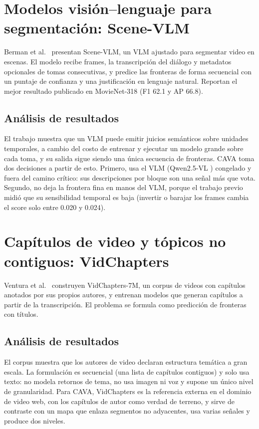 \section{Modelos visión--lenguaje para segmentación: Scene-VLM}

Berman et al.\ \cite{berman2025scenevlm} presentan Scene-VLM, un VLM ajustado para segmentar
video en escenas. El modelo recibe frames, la transcripción del diálogo y metadatos
opcionales de tomas consecutivas, y predice las fronteras de forma secuencial con un puntaje
de confianza y una justificación en lenguaje natural. Reportan el mejor resultado publicado
en MovieNet-318 (F1 62.1 y AP 66.8).

\subsection{Análisis de resultados}
El trabajo muestra que un VLM puede emitir juicios semánticos sobre unidades temporales, a
cambio del costo de entrenar y ejecutar un modelo grande sobre cada toma, y su salida sigue
siendo una única secuencia de fronteras. CAVA toma dos decisiones a partir de esto. Primero,
usa el VLM (Qwen2.5-VL \cite{bai2025qwen25vl}) congelado y fuera del camino crítico: sus
descripciones por bloque son una señal más que vota. Segundo, no deja la frontera fina en
manos del VLM, porque el trabajo previo midió que su sensibilidad temporal es baja (invertir o
barajar los frames cambia el score solo entre 0.020 y 0.024).

\section{Capítulos de video y tópicos no contiguos: VidChapters}

Ventura et al.\ \cite{ventura2024vidchapters} construyen VidChapters-7M, un corpus de videos
con capítulos anotados por sus propios autores, y entrenan modelos que generan capítulos a
partir de la transcripción. El problema se formula como predicción de fronteras con títulos.

\subsection{Análisis de resultados}
El corpus muestra que los autores de video declaran estructura temática a gran escala. La
formulación es secuencial (una lista de capítulos contiguos) y solo usa texto: no modela
retornos de tema, no usa imagen ni voz y supone un único nivel de granularidad. Para CAVA,
VidChapters es la referencia externa en el dominio de video web, con los capítulos de autor
como verdad de terreno, y sirve de contraste con un mapa que enlaza segmentos no adyacentes,
usa varias señales y produce dos niveles.

